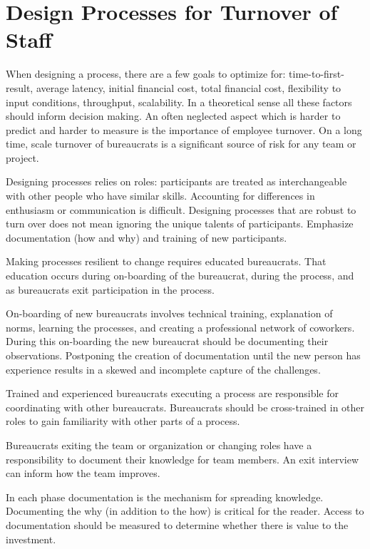 \section{Design Processes for Turnover of Staff\label{sec:turnover}}


When designing a process, there are a few goals to optimize for: time-to-first-result, average latency, initial financial cost, total financial cost, flexibility to input conditions, throughput, scalability. In a theoretical sense all these factors should inform decision making. An often neglected aspect which is harder to predict and harder to measure is the importance of employee turnover. On a long time, scale turnover of bureaucrats is a significant source of risk for any team or project. 

Designing processes relies on roles: participants are treated as interchangeable with other people who have similar skills. Accounting for differences in enthusiasm or communication is difficult. 
Designing processes that are robust to turn over does not mean ignoring the unique talents of participants. 
Emphasize documentation (how and why) and training of new participants. 

Making processes resilient to change requires educated bureaucrats. That education occurs during on-boarding of the bureaucrat, during the process, and as bureaucrats exit participation in the process. 

On-boarding of new bureaucrats involves technical training, explanation of norms, learning the processes, and creating a professional network of coworkers. During this on-boarding the new bureaucrat should be documenting their observations. Postponing the creation of documentation until the new person has experience results in a skewed and incomplete capture of the challenges.

Trained and experienced bureaucrats executing a process are responsible for coordinating with other bureaucrats. Bureaucrats should be cross-trained in other roles to gain familiarity with other parts of a process. 

Bureaucrats exiting the team or organization or changing roles have a responsibility to document their knowledge for team members. An exit interview can inform how the team improves. 

In each phase documentation is the mechanism for spreading knowledge. Documenting the why (in addition to the how) is critical for the reader. Access to documentation should be measured to determine whether there is value to the investment. 